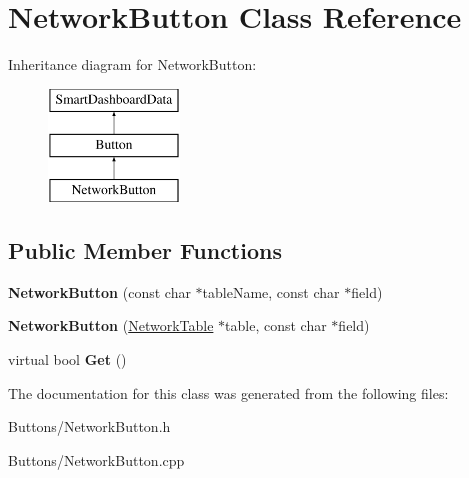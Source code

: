 \hypertarget{classNetworkButton}{
\section{NetworkButton Class Reference}
\label{classNetworkButton}
}
Inheritance diagram for NetworkButton:\begin{figure}[H]
\begin{center}
\leavevmode
\includegraphics[height=3.000000cm]{classNetworkButton}
\end{center}
\end{figure}
\subsection*{Public Member Functions}
\begin{DoxyCompactItemize}
\item 
\hypertarget{classNetworkButton_a1c83a74cf6a8e2a5c5be275cecdcadcd}{
{\bfseries NetworkButton} (const char $\ast$tableName, const char $\ast$field)}
\label{classNetworkButton_a1c83a74cf6a8e2a5c5be275cecdcadcd}

\item 
\hypertarget{classNetworkButton_a74bf99a28a740b8aefac0f91673b96b4}{
{\bfseries NetworkButton} (\hyperlink{classNetworkTable}{NetworkTable} $\ast$table, const char $\ast$field)}
\label{classNetworkButton_a74bf99a28a740b8aefac0f91673b96b4}

\item 
\hypertarget{classNetworkButton_a781b80feef087a7d150016888032b383}{
virtual bool {\bfseries Get} ()}
\label{classNetworkButton_a781b80feef087a7d150016888032b383}

\end{DoxyCompactItemize}


The documentation for this class was generated from the following files:\begin{DoxyCompactItemize}
\item 
Buttons/NetworkButton.h\item 
Buttons/NetworkButton.cpp\end{DoxyCompactItemize}
